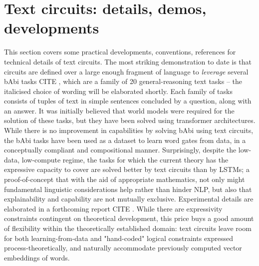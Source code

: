 \section{Text circuits: details, demos, developments}\label{sec:circs}


This section covers some practical developments, conventions, references for technical details of text circuits. The most striking demonstration to date is that circuits are defined over a large enough fragment of language to \emph{leverage} several bAbi tasks \bR CITE \e, which are a family of 20 general-reasoning text tasks -- the italicised choice of wording will be elaborated shortly. Each family of tasks consists of tuples of text in simple sentences concluded by a question, along with an answer. It was initially believed that world models were required for the solution of these tasks, but they have been solved using transformer architectures. While there is no improvement in capabilities by solving bAbi using text circuits, the bAbi tasks have been used as a dataset to learn word gates from data, in a conceptually compliant and compositional manner. Surprisingly, despite the low-data, low-compute regime, the tasks for which the current theory has the expressive capacity to cover are solved better by text circuits than by LSTMs; a proof-of-concept that with the aid of appropriate mathematics, not only might fundamental linguistic considerations help rather than hinder NLP, but also that explainability and capability are not mutually exclusive. Experimental details are elaborated in a forthcoming report \bR CITE \e. While there are expressivity constraints contingent on theoretical development, this price buys a good amount of flexibility within the theoretically established domain: text circuits leave room for both learning-from-data and "hand-coded" logical constraints expressed process-theoretically, and naturally accommodate previously computed vector embeddings of words.\\

